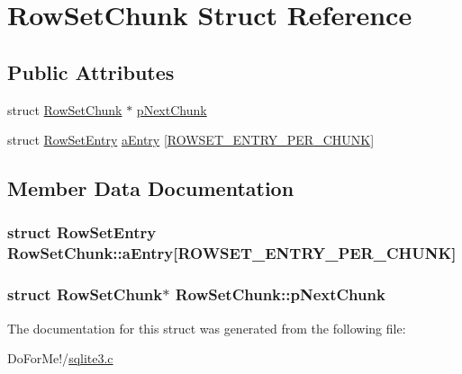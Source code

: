 \hypertarget{struct_row_set_chunk}{\section{Row\-Set\-Chunk Struct Reference}
\label{struct_row_set_chunk}
}
\subsection*{Public Attributes}
\begin{DoxyCompactItemize}
\item 
struct \hyperlink{struct_row_set_chunk}{Row\-Set\-Chunk} $\ast$ \hyperlink{struct_row_set_chunk_ae8f0975c86633ae2bb8b212d3a767554}{p\-Next\-Chunk}
\item 
struct \hyperlink{struct_row_set_entry}{Row\-Set\-Entry} \hyperlink{struct_row_set_chunk_abde97bbb07c3bf9454e719ff860bdd1f}{a\-Entry} \mbox{[}\hyperlink{sqlite3_8c_a351eaade204118dea320a04b9a584b10}{R\-O\-W\-S\-E\-T\-\_\-\-E\-N\-T\-R\-Y\-\_\-\-P\-E\-R\-\_\-\-C\-H\-U\-N\-K}\mbox{]}
\end{DoxyCompactItemize}


\subsection{Member Data Documentation}
\hypertarget{struct_row_set_chunk_abde97bbb07c3bf9454e719ff860bdd1f}{
\subsubsection[{a\-Entry}]{\setlength{\rightskip}{0pt plus 5cm}struct {\bf Row\-Set\-Entry} Row\-Set\-Chunk\-::a\-Entry\mbox{[}{\bf R\-O\-W\-S\-E\-T\-\_\-\-E\-N\-T\-R\-Y\-\_\-\-P\-E\-R\-\_\-\-C\-H\-U\-N\-K}\mbox{]}}}\label{struct_row_set_chunk_abde97bbb07c3bf9454e719ff860bdd1f}
\hypertarget{struct_row_set_chunk_ae8f0975c86633ae2bb8b212d3a767554}{
\subsubsection[{p\-Next\-Chunk}]{\setlength{\rightskip}{0pt plus 5cm}struct {\bf Row\-Set\-Chunk}$\ast$ Row\-Set\-Chunk\-::p\-Next\-Chunk}}\label{struct_row_set_chunk_ae8f0975c86633ae2bb8b212d3a767554}


The documentation for this struct was generated from the following file\-:\begin{DoxyCompactItemize}
\item 
Do\-For\-Me!/\hyperlink{sqlite3_8c}{sqlite3.\-c}\end{DoxyCompactItemize}
